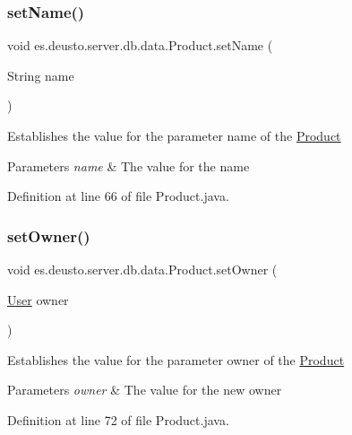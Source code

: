 \subsubsection{\texorpdfstring{set\+Name()}{setName()}}
{\footnotesize\ttfamily void es.\+deusto.\+server.\+db.\+data.\+Product.\+set\+Name (\begin{DoxyParamCaption}\item[{String}]{name }\end{DoxyParamCaption})}

Establishes the value for the parameter name of the \hyperlink{classes_1_1deusto_1_1server_1_1db_1_1data_1_1_product}{Product} 
\begin{DoxyParams}{Parameters}
{\em name} & The value for the name \\
\hline
\end{DoxyParams}


Definition at line 66 of file Product.\+java.

\mbox{\label{classes_1_1deusto_1_1server_1_1db_1_1data_1_1_product_a72a7c230f6309248b5f6e6027189c996}} 
\subsubsection{\texorpdfstring{set\+Owner()}{setOwner()}}
{\footnotesize\ttfamily void es.\+deusto.\+server.\+db.\+data.\+Product.\+set\+Owner (\begin{DoxyParamCaption}\item[{\hyperlink{classes_1_1deusto_1_1server_1_1db_1_1data_1_1_user}{User}}]{owner }\end{DoxyParamCaption})}

Establishes the value for the parameter owner of the \hyperlink{classes_1_1deusto_1_1server_1_1db_1_1data_1_1_product}{Product} 
\begin{DoxyParams}{Parameters}
{\em owner} & The value for the new owner \\
\hline
\end{DoxyParams}


Definition at line 72 of file Product.\+java.

\mbox{\label{classes_1_1deusto_1_1server_1_1db_1_1data_1_1_product_a4cc3da392d5679515cd8da38f88bc920}} 
